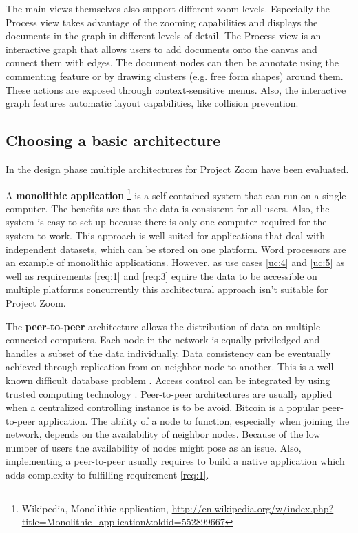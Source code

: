 The main views themselves also support different zoom levels. Especially the Process view takes advantage of the zooming capabilities and displays the documents in the graph in different levels of detail. 
The Process view is an interactive graph that allows users to add documents onto the canvas and connect them with edges. The document nodes can then be annotate using the commenting feature or by drawing clusters (e.g. free form shapes) around them. These actions are exposed through context-sensitive menus. Also, the interactive graph features automatic layout capabilities, like collision prevention.


\subsection{Choosing a basic architecture}
In the design phase multiple architectures for Project Zoom have been evaluated. 

A \textbf{monolithic application} \footnote{Wikipedia, Monolithic application, \url{http://en.wikipedia.org/w/index.php?title=Monolithic_application&oldid=552899667}} is a self-contained system that can run on a single computer. The benefits are that the data is consistent for all users.  Also, the system is easy to set up because there is only one computer required for the system to work. This approach is well suited for applications that deal with independent datasets, which can be stored on one platform. Word processors are an example of monolithic applications. However, as use cases \ref{uc:4} and \ref{uc:5} as well as requirements \ref{req:1} and \ref{req:3} equire the data to be accessible on multiple platforms concurrently this architectural approach isn't suitable for Project Zoom.

The \textbf{peer-to-peer} \cite{Schollmeier_2001} architecture allows the distribution of data on multiple connected computers. Each node in the network is equally priviledged and handles a subset of the data individually. Data consistency can be eventually achieved through replication from on neighbor node to another. This is a well-known difficult database problem \cite{Gray_1996}. Access control can be integrated by using trusted computing technology \cite{Sandhu_2005}. Peer-to-peer architectures are usually applied when a centralized controlling instance is to be avoid. Bitcoin is a popular peer-to-peer application. The ability of a node to function, especially when joining the network, depends on the availability of neighbor nodes. Because of the low number of users the availability of nodes might pose as an issue. Also, implementing a peer-to-peer usually requires to build a native application which adds complexity to fulfilling requirement \ref{req:1}.

